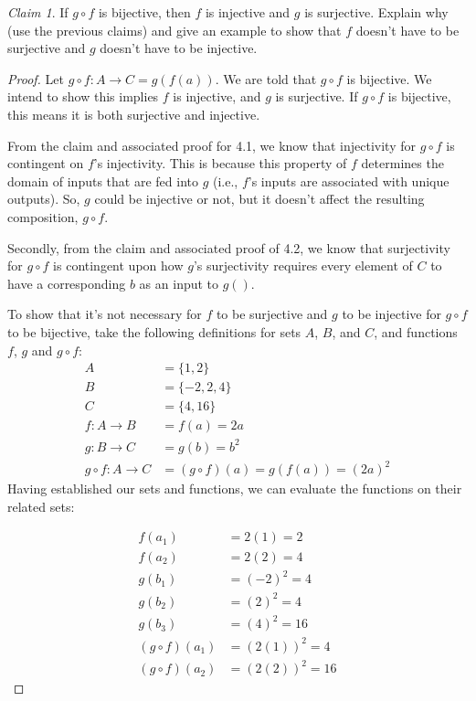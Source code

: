 \documentclass[12pt,oneside]{amsart}
\theoremstyle{remark}
\newtheorem{claim}{Claim}[exer]
\begin{document}
\begin{claim}
If $g \circ f$ is bijective, then $f$ is injective and $g$ is surjective. Explain why (use the previous claims) and give an example to show that $f$ doesn’t have to be surjective and $g$ doesn’t have to be injective.
\end{claim}
\begin{proof}
Let $g \circ f: A \to C = g(f(a))$. We are told that $g \circ f$ is bijective. We intend to show this implies $f$ is injective, and $g$ is surjective. If $g \circ f$ is bijective, this means it is both surjective and injective.

From the claim and associated proof for 4.1, we know that injectivity for $g \circ f$ is contingent on $f$'s injectivity. This is because this property of $f$ determines the domain of inputs that are fed into $g$ (i.e., $f$'s inputs are associated with unique outputs). So, $g$ could be injective or not, but it doesn't affect the resulting composition, $g \circ f$.

Secondly, from the claim and associated proof of 4.2, we know that surjectivity for $g \circ f$ is contingent upon how $g$'s surjectivity requires every element of $C$ to have a corresponding $b$ as an input to $g()$.

To show that it's not necessary for $f$ to be surjective and $g$ to be injective for $g \circ f$ to be bijective, take the following definitions for sets $A$, $B$, and $C$, and functions $f$, $g$ and $g \circ f$:
\begin{equation}
\begin{split}
                 A &= \{ 1, 2 \} \\
                 B &= \{ -2, 2, 4 \} \\
                 C &= \{ 4, 16 \} \\
        f: A \to B &= f(a) = 2a \\
        g: B \to C &= g(b) = b^2 \\
g \circ f: A \to C &= (g \circ f)(a) = g(f(a)) = (2a)^2
\end{split}
\end{equation}
Having established our sets and functions, we can evaluate the functions on their related sets:

\begin{equation}
\begin{split}
          f(a_1) &= 2(1) = 2 \\
          f(a_2) &= 2(2) = 4 \\
          g(b_1) &= (-2)^2 = 4 \\
          g(b_2) &= (2)^2 = 4 \\
          g(b_3) &= (4)^2 = 16 \\
(g \circ f)(a_1) &= (2(1))^2 = 4 \\
(g \circ f)(a_2) &= (2(2))^2 = 16
\end{split}
\end{equation}


\end{proof}
\end{document}
